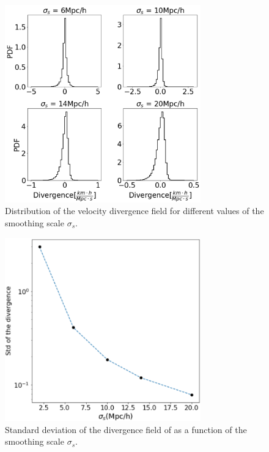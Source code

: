 \documentclass[usenatbib]{mnras}
\begin{document}
\begin{figure}
    \centering
    \includegraphics[width=240pt]{smooth_grad_dist.pdf}
    \caption{Distribution of the velocity divergence field
      for different values of the smoothing scale $\sigma_s$.}
    \label{fig:smooth_grad_dist}
\end{figure}



\begin{figure}
    \centering
    \includegraphics[width=240pt]{std_smooth.pdf}
    \caption{Standard deviation of the divergence field of
      as a function of the smoothing scale $\sigma_s$.}
    \label{fig:std_smooth}
\end{figure}
\end{document}
